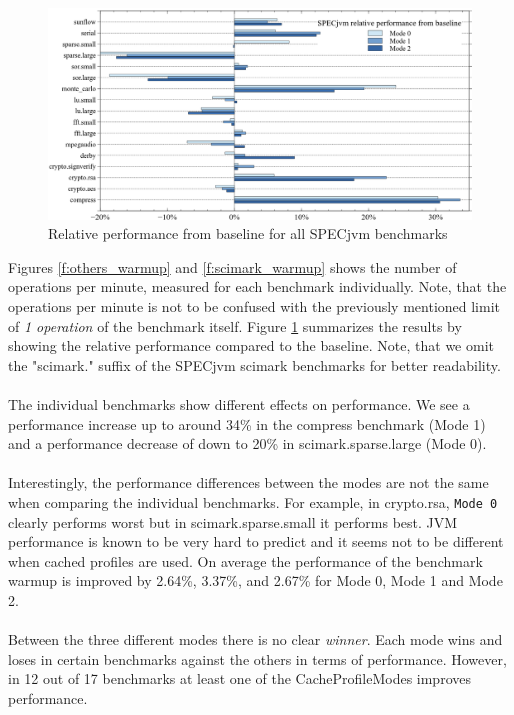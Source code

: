 \begin{figure}[ht]
  \begin{center}
    \centering
    \includegraphics[width=1.0\textwidth]{figures/all_warmup_variation.png}
    \caption{Relative performance from baseline for all SPECjvm benchmarks}
    \label{f:all_warmup_variation}
  \end{center}
\end{figure}
Figures \ref{f:others_warmup} and \ref{f:scimark_warmup} shows the number of operations per minute, measured for each benchmark individually. Note, that the operations per minute is not to be confused with the previously mentioned limit of \textit{1 operation} of the benchmark itself.
Figure \ref{f:all_warmup_variation} summarizes the results by showing the relative performance compared to the baseline.
Note, that we omit the "scimark." suffix of the SPECjvm scimark benchmarks for better readability.
\\\\
The individual benchmarks show different effects on performance. We see a performance increase up to around 34\% in the compress benchmark (Mode 1) and a performance decrease of down to 20\% in scimark.sparse.large (Mode 0).
\\\\
Interestingly, the performance differences between the modes are not the same when comparing the individual benchmarks. For example, in crypto.rsa, \texttt{Mode 0} clearly performs worst but in scimark.sparse.small it performs best.
JVM performance is known to be very hard to predict and it seems not to be different when cached profiles are used. On average the performance of the benchmark warmup is improved by 2.64\%, 3.37\%, and 2.67\% for Mode 0, Mode 1 and Mode 2.
\\\\
Between the three different modes there is no clear \textit{winner}. Each mode wins and loses in certain benchmarks against the others in terms of performance. However, in 12 out of 17 benchmarks at least one of the CacheProfileModes improves performance. 
